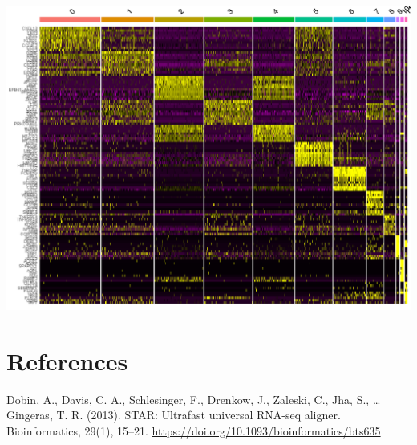 \documentclass[]{book}
\begin{document}
\includegraphics[width=16.67in]{_book/10X_files/figure-html/heatmap_clusters}

\hypertarget{references}{%
\chapter{References}\label{references}}

Dobin, A., Davis, C. A., Schlesinger, F., Drenkow, J., Zaleski, C., Jha, S., \ldots{} Gingeras, T. R. (2013). STAR: Ultrafast universal RNA-seq aligner. Bioinformatics, 29(1), 15--21. \url{https://doi.org/10.1093/bioinformatics/bts635}


\end{document}
